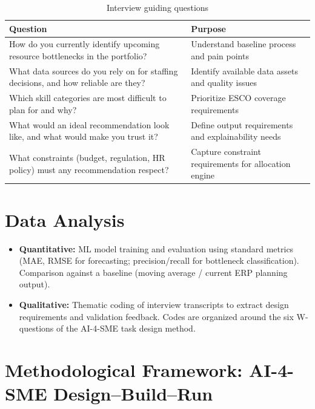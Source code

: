 \begin{table}[htbp]
  \centering
  \caption{Interview guiding questions}
  \label{tab:interview_questions}
  \begin{tabular}{@{}p{9cm}p{5.5cm}@{}}
    \toprule
    \textbf{Question} & \textbf{Purpose} \\
    \midrule
    How do you currently identify upcoming resource bottlenecks in the portfolio? &
    Understand baseline process and pain points \\[0.4em]
    What data sources do you rely on for staffing decisions, and how reliable are they? &
    Identify available data assets and quality issues \\[0.4em]
    Which skill categories are most difficult to plan for and why? &
    Prioritize ESCO coverage requirements \\[0.4em]
    What would an ideal recommendation look like, and what would make you trust it? &
    Define output requirements and explainability needs \\[0.4em]
    What constraints (budget, regulation, HR policy) must any recommendation respect? &
    Capture constraint requirements for allocation engine \\
    \bottomrule
  \end{tabular}
\end{table}

\section{Data Analysis}
\label{sec:data_analysis}

\begin{itemize}
  \item \textbf{Quantitative:} ML model training and evaluation using standard metrics
        (MAE, RMSE for forecasting; precision/recall for bottleneck classification).
        Comparison against a baseline (moving average / current ERP planning output).

  \item \textbf{Qualitative:} Thematic coding of interview transcripts to extract design
        requirements and validation feedback. Codes are organized around the six W-questions
        of the AI-4-SME task design method.
\end{itemize}

\section{Methodological Framework: AI-4-SME Design--Build--Run}
\label{sec:ai4sme_phases}

